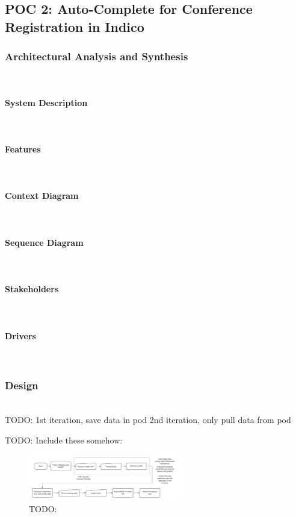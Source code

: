 \subsection{POC 2: Auto-Complete for Conference Registration in Indico}

\subsubsection{Architectural Analysis and Synthesis}\mbox{}\\

\paragraph{System Description}\mbox{}\\
\paragraph{Features}\mbox{}\\
\paragraph{Context Diagram}\mbox{}\\
\paragraph{Sequence Diagram}\mbox{}\\
\paragraph{Stakeholders}\mbox{}\\
\paragraph{Drivers}\mbox{}\\

\subsubsection{Design}\mbox{}\\

TODO:
1st iteration, save data in pod
2nd iteration, only pull data from pod

TODO: Include these somehow:

\begin{figure}
    \centering
    \includegraphics[width=0.6\textwidth]{prototype/graphs/poc-conference_registration_flow-client_side-sideways.jpeg}
    \caption{TODO:}
    \label{fig:poc-conference_registration_flow-client_side-sideways}
\end{figure}

